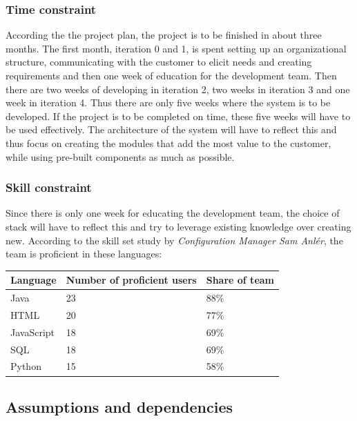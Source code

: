 \documentclass{article}
\begin{document}
\subsubsection{Time constraint}
According the the project plan, the project is to be finished in about three months. The first month, iteration 0 and 1, is spent setting up an organizational structure, communicating with the customer to elicit needs and creating requirements and then one week of education for the development team. Then there are two weeks of developing in iteration 2, two weeks in iteration 3 and one week in iteration 4. 
Thus there are only five weeks where the system is to be developed. If the project is to be completed on time, these five weeks will have to be used effectively. The architecture of the system will have to reflect this and thus focus on creating the modules that add the most value to the customer, while using pre-built components as much as possible.

\subsubsection{Skill constraint}
Since there is only one week for educating the development team, the choice of stack will have to reflect this and try to leverage existing knowledge over creating new. According to the skill set study by \emph{Configuration Manager Sam Anlér}, the team is proficient in these languages:

\begin{table}[h]
\centering
\begin{tabular}{|l|l|l|}
\hline
Language & Number of proficient users & Share of team \\ \hline
Java & 23 & 88\% \\
HTML & 20 & 77\% \\ 
JavaScript & 18 & 69\% \\ 
SQL & 18 & 69\% \\ 
Python & 15 & 58\% \\ 
\hline
\end{tabular}
\end{table}



\subsection{Assumptions and dependencies}
\end{document}
